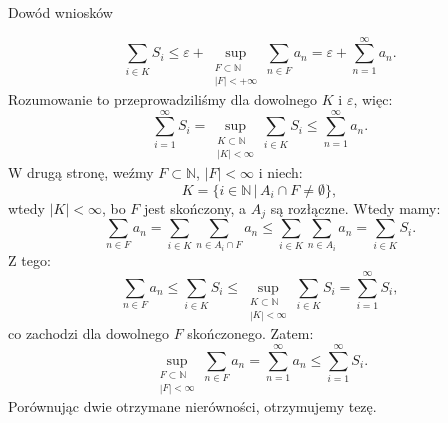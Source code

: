 \documentclass{article}
\newcommand{\N}{\mathbb{N}}
\newcommand{\oo}{\infty}
\begin{document}
\begin{dow}{Dowód wniosków}
\begin{enumerate}
            \[\sum_{i \in K} S_i \leqslant \varepsilon + \sup_{\substack{F\subset \N \\ |F| <  +\oo}} \sum_{n \in F} a_n = \varepsilon + \sum_{n=1}^{\oo} a_n.\]
            Rozumowanie to przeprowadziliśmy dla dowolnego $K$ i $\varepsilon$, więc:
            \[\sum_{i=1}^{\oo} S_i = \sup_{\substack{K \subset \N \\ |K| < \oo}} \sum_{i \in K} S_i \leqslant \sum_{n=1}^{\oo} a_n.\]
            W drugą stronę, weźmy $F \subset \N$, $|F| < \oo$ i niech:
            \[K = \{ i \in \N \, |\, A_i \cap F \neq \emptyset \},\]
            wtedy $|K| < \oo$, bo $F$ jest skończony, a $A_j$ są rozłączne. Wtedy mamy:
            \[\sum_{n\in F} a_n = \sum_{i\in K} \sum_{n \in A_i \cap F} a_n \leqslant \sum_{i \in K} \sum_{n \in A_i} a_n = \sum_{i \in K} S_i.\]
            Z tego:
            \[\sum_{n \in F} a_n \leqslant \sum_{i \in K} S_i \leqslant \sup_{\substack{K \subset \N \\ |K| < \oo}} \sum_{i \in K} S_i = \sum_{i =1}^{\oo} S_i, \]
            co zachodzi dla dowolnego $F$ skończonego. Zatem:
            \[\sup_{\substack{F \subset \N \\ |F| < \oo}}\sum_{n \in F} a_n = \sum_{n=1}^{\oo}a_n \leqslant \sum_{i =1}^{\oo} S_i.\]
            Porównując dwie otrzymane nierówności, otrzymujemy tezę.
        \end{enumerate}
    \end{dow}
\end{document}

